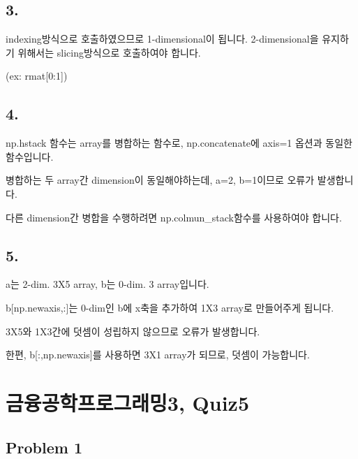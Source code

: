 \documentclass[
  a4paper,
  DIV=11,
  numbers=noendperiod]{scrreprt}
\begin{document}
\section*{3.}\label{section-7}


indexing방식으로 호출하였으므로 1-dimensional이 됩니다. 2-dimensional을
유지하기 위해서는 slicing방식으로 호출하여야 합니다.

(ex: rmat{[}0:1{]})

\section*{4.}\label{section-8}


np.hstack 함수는 array를 병합하는 함수로, np.concatenate에 axis=1 옵션과
동일한 함수입니다.

병합하는 두 array간 dimension이 동일해야하는데, a=2, b=1이므로 오류가
발생합니다.

다른 dimension간 병합을 수행하려면 np.colmun\_stack함수를 사용하여야
합니다.

\section*{5.}\label{section-9}


a는 2-dim. 3X5 array, b는 0-dim. 3 array입니다.

b{[}np.newaxis,:{]}는 0-dim인 b에 x축을 추가하여 1X3 array로 만들어주게
됩니다.

3X5와 1X3간에 덧셈이 성립하지 않으므로 오류가 발생합니다.

한편, b{[}:,np.newaxis{]}를 사용하면 3X1 array가 되므로, 덧셈이
가능합니다.

\chapter*{금융공학프로그래밍3,
Quiz5}\label{uxae08uxc735uxacf5uxd559uxd504uxb85cuxadf8uxb798uxbc0d3-quiz5}


\section*{Problem 1}\label{problem-1}
\end{document}

